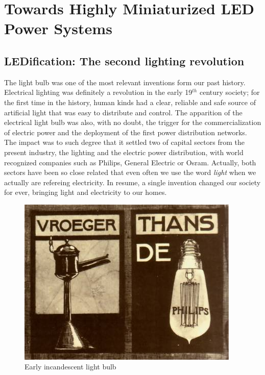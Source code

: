\part{Towards Highly Miniaturized LED Power Systems }
\label{ch:twrd_HMLED}

\chapter[LEDification]{LEDification: The second lighting revolution}


The light bulb was one of the most relevant inventions form our past history.  Electrical lighting was definitely a revolution in the early 19$^{th}$ century society; for the first time in the history, human kinds had a clear, reliable and safe source of artificial light that was easy to distribute and control.
The apparition  of the electrical light bulb was also, with no doubt, the trigger for the commercialization of electric power and the deployment of the first power distribution networks. The impact was to such degree that it settled two of capital sectors from the present industry, the lighting and the electric power distribution, with  world recognized companies such as Philips, General Electric or Osram.  Actually, both sectors have been so close related that even often we use the word \emph{light} when we actually are refereing electricity. In resume, a single invention changed our society for ever, bringing light and electricity to our homes.

\begin{figure}[!h]
\centering
\includegraphics{./0_intro/img/1900-philips3.jpg}
\caption{Early incandescent light bulb}
\label{fig:incandescent_light_blub}
\end{figure}


